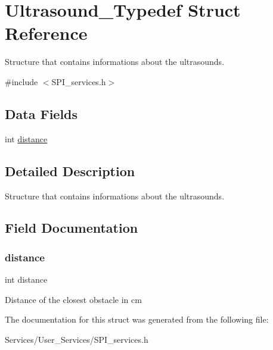 \hypertarget{struct_ultrasound___typedef}{}\section{Ultrasound\+\_\+\+Typedef Struct Reference}
\label{struct_ultrasound___typedef}


Structure that contains informations about the ultrasounds.  




{\ttfamily \#include $<$S\+P\+I\+\_\+services.\+h$>$}

\subsection*{Data Fields}
\begin{DoxyCompactItemize}
\item 
int \hyperlink{struct_ultrasound___typedef_afb9412686cd344ad61757c1c19ba8a87}{distance}
\end{DoxyCompactItemize}


\subsection{Detailed Description}
Structure that contains informations about the ultrasounds. 

\subsection{Field Documentation}
\mbox{\label{struct_ultrasound___typedef_afb9412686cd344ad61757c1c19ba8a87}} 
\subsubsection{\texorpdfstring{distance}{distance}}
{\footnotesize\ttfamily int distance}

Distance of the closest obstacle in cm 

The documentation for this struct was generated from the following file\+:\begin{DoxyCompactItemize}
\item 
Services/\+User\+\_\+\+Services/S\+P\+I\+\_\+services.\+h\end{DoxyCompactItemize}
